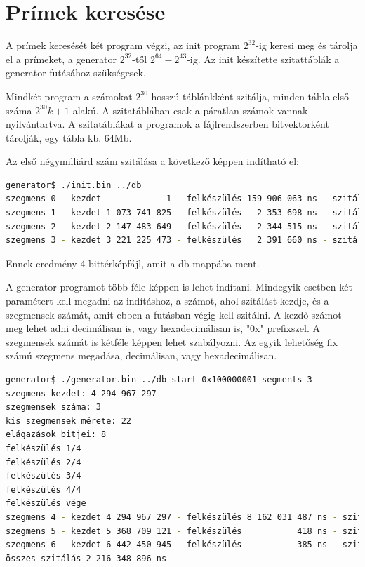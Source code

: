 \section{Prímek keresése}

A prímek keresését két program végzi, az init program
$2^{32}$-ig keresi meg és tárolja el a prímeket,
a generator $2^{32}$-től $2^{64}-2^{43}$-ig.
Az init készítette szitattáblák a generator futásához szükségesek.

Mindkét program a számokat $2^{30}$ hosszú táblánkként szitálja,
minden tábla első száma $2^{30}k+1$ alakú.
A szitatáblában csak a páratlan számok vannak nyilvántartva.
A szitatáblákat a programok a
fájlrendszerben bitvektorként tárolják, egy tábla kb. $64$Mb.

Az első négymilliárd szám szitálása a következő képpen indítható el:

\begin{lstlisting}[language=bash]
generator$ ./init.bin ../db
szegmens 0 - kezdet             1 - felkészülés 159 906 063 ns - szitálás 1 122 878 403 ns
szegmens 1 - kezdet 1 073 741 825 - felkészülés   2 353 698 ns - szitálás 1 171 101 336 ns
szegmens 2 - kezdet 2 147 483 649 - felkészülés   2 344 515 ns - szitálás 1 188 330 478 ns
szegmens 3 - kezdet 3 221 225 473 - felkészülés   2 391 660 ns - szitálás 1 199 900 603 ns
\end{lstlisting}
Ennek eredmény 4 bittérképfájl, amit a db mappába ment.  %

A generator programot több féle képpen is lehet indítani.
Mindegyik esetben két paramétert kell megadni az indításhoz,
a számot, ahol szitálást kezdje, és a szegmensek számát, amit
ebben a futásban végig kell szitálni.
A kezdő számot meg lehet adni decimálisan is, vagy hexadecimálisan is,
"0x" prefixszel. A szegmensek számát is kétféle képpen lehet szabályozni.
Az egyik lehetőség fix számú szegmens megadása, decimálisan, vagy hexadecimálisan.

\begin{lstlisting}[language=bash]
generator$ ./generator.bin ../db start 0x100000001 segments 3
szegmens kezdet: 4 294 967 297
szegmensek száma: 3
kis szegmensek mérete: 22
elágazások bitjei: 8
felkészülés 1/4
felkészülés 2/4
felkészülés 3/4
felkészülés 4/4
felkészülés vége
szegmens 4 - kezdet 4 294 967 297 - felkészülés 8 162 031 487 ns - szitálás 729 914 370 ns
szegmens 5 - kezdet 5 368 709 121 - felkészülés           418 ns - szitálás 736 412 117 ns
szegmens 6 - kezdet 6 442 450 945 - felkészülés           385 ns - szitálás 750 022 409 ns
összes szitálás 2 216 348 896 ns
\end{lstlisting}

